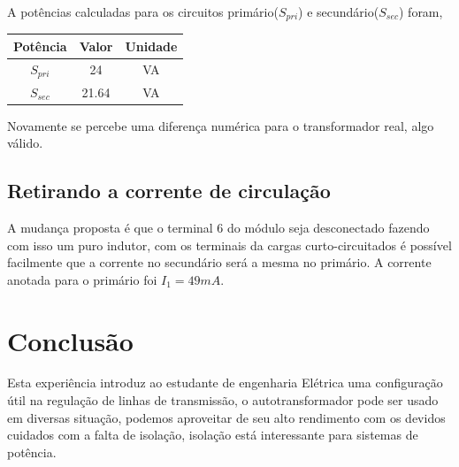 \documentclass[paper=a4, fontsize=11pt]{article}
\begin{document}
A potências calculadas para os circuitos primário($S_{pri}$) e secundário($S_{sec}$) foram, 


\begin{center}
    \begin{tabular}{c||c||c}
        Potência & Valor & Unidade \\
        \hline
        $S_{pri}$ & 24 & VA \\
        $S_{sec}$ & 21.64 & VA \\
    \end{tabular}
\end{center}

Novamente se percebe uma diferença numérica para o transformador real, algo 
válido.

\subsection{Retirando a corrente de circulação}

A mudança proposta é que o terminal 6 do módulo seja desconectado fazendo com isso
um puro indutor, com os terminais da cargas curto-circuitados é possível facilmente
que a corrente no secundário será a mesma no primário. A corrente anotada para
o primário foi $I_1 = 49 mA$.


\section{Conclusão}

Esta experiência introduz ao estudante de engenharia Elétrica uma configuração
útil na regulação de linhas de transmissão, o autotransformador pode ser usado
em diversas situação, podemos aproveitar de seu alto rendimento com os devidos
cuidados com a falta de isolação, isolação está interessante para sistemas de potência.
\end{document}
